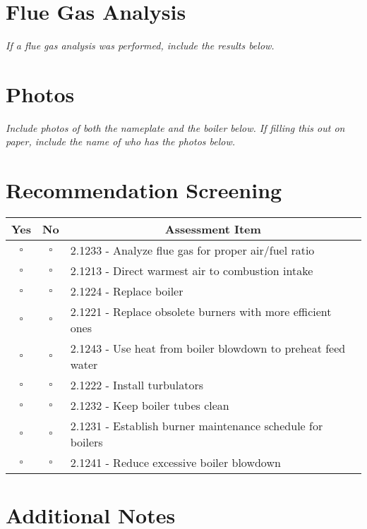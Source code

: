 \documentclass[./main.tex]{subfiles}
\begin{document}
\section*{Flue Gas Analysis}
\emph{If a flue gas analysis was performed, include the results below. }

\vspace{4cm}

\clearpage \section*{Photos}
\emph{Include photos of both the nameplate and the boiler below. If filling this out on paper, include the name of who has the photos below. }


\section*{Recommendation Screening}
\begin{tabular}{|c|c|p{13.5cm}|}
\hline
\multicolumn{1}{|c|}{\textbf{Yes}} & \multicolumn{1}{c|}{\textbf{No}} & \multicolumn{1}{c|}{\textbf{Assessment Item}} \\
\hline
$\square$ & $\square$ & 2.1233 - Analyze flue gas for proper air/fuel ratio \\
\hline
$\square$ & $\square$ & 2.1213 - Direct warmest air to combustion intake \\
\hline
$\square$ & $\square$ & 2.1224 - Replace boiler \\
\hline
$\square$ & $\square$ & 2.1221 - Replace obsolete burners with more efficient ones \\
\hline
$\square$ & $\square$ & 2.1243 - Use heat from boiler blowdown to preheat feed water \\
\hline
$\square$ & $\square$ & 2.1222 - Install turbulators \\
\hline
$\square$ & $\square$ & 2.1232 - Keep boiler tubes clean \\
\hline
$\square$ & $\square$ & 2.1231 - Establish burner maintenance schedule for boilers \\
\hline
$\square$ & $\square$ & 2.1241 - Reduce excessive boiler blowdown \\
\hline
\end{tabular}

\section*{Additional Notes}
\vspace{4cm}



\end{document}
